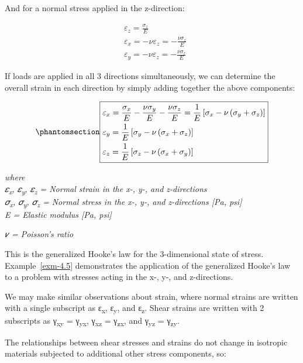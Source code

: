 \documentclass[
  letterpaper,
  DIV=11,
  numbers=noendperiod]{scrreprt}
\theoremstyle{definition}
\theoremstyle{remark}
\begin{document}
And for a normal stress applied in the z-direction:

\[
\begin{aligned}
& \varepsilon_z=\frac{\sigma_z}{E} \\
& \varepsilon_x=-\nu \varepsilon_z=-\frac{\nu \sigma_z}{E} \\
& \varepsilon_y=-\nu \varepsilon_z=-\frac{\nu \sigma_z}{E}
\end{aligned}
\]

If loads are applied in all 3 directions simultaneously, we can
determine the overall strain in each direction by simply adding together
the above components:

\begin{equation}\phantomsection\label{eq-4.7}{
\boxed{\begin{aligned}
& \varepsilon_x=\frac{\sigma_x}{E}-\frac{\nu \sigma_y}{E}-\frac{\nu \sigma_z}{E}=\frac{1}{E}\left[\sigma_x-\nu\left(\sigma_y+\sigma_z\right)\right] \\
& \varepsilon_y=\frac{1}{E}\left[\sigma_y-\nu\left(\sigma_x+\sigma_z\right)\right] \\
& \varepsilon_z=\frac{1}{E}\left[\sigma_z-\nu\left(\sigma_x+\sigma_y\right)\right]
\end{aligned}}
}\end{equation}

\emph{where}\\
\emph{𝜀\textsubscript{x}, 𝜀\textsubscript{y}, 𝜀\textsubscript{z} =
Normal strain in the x-, y-, and z-directions}\\
\emph{𝜎\textsubscript{x}, 𝜎\textsubscript{y}, 𝜎\textsubscript{z} =
Normal stress in the x-, y-, and z-directions {[}Pa, psi{]}}\\
\emph{E = Elastic modulus {[}Pa, psi{]}}

\emph{𝜈 = Poisson's ratio}

This is the generalized Hooke's law for the 3-dimensional state of
stress. Example~\ref{exm-4.5} demonstrates the application of the
generalized Hooke's law to a problem with stresses acting in the x-, y-,
and z-directions.

We may make similar observations about strain, where normal strains are
written with a single subscript as ε\textsubscript{x},
ε\textsubscript{y}, and ε\textsubscript{z}. Shear strains are written
with 2 subscripts as γ\textsubscript{xy} = γ\textsubscript{yx},
γ\textsubscript{xz} = γ\textsubscript{zx}, and γ\textsubscript{yz} =
γ\textsubscript{zy}.

The relationships between shear stresses and strains do not change in
isotropic materials subjected to additional other stress components, so:
\end{document}
